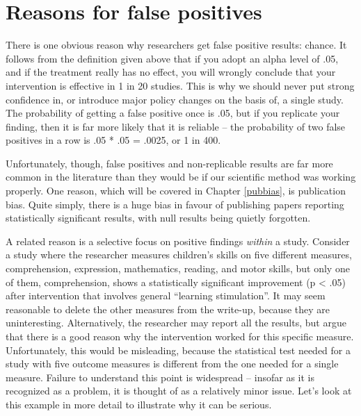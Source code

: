 \documentclass{krantz}
\begin{document}
\hypertarget{reasons-for-false-positives}{%
\section{Reasons for false positives}\label{reasons-for-false-positives}}

There is one obvious reason why researchers get false positive results: chance. It follows from the definition given above that if you adopt an alpha level of .05, and if the treatment really has no effect, you will wrongly conclude that your intervention is effective in 1 in 20 studies. This is why we should never put strong confidence in, or introduce major policy changes on the basis of, a single study. The probability of getting a false positive once is .05, but if you replicate your finding, then it is far more likely that it is reliable -- the probability of two false positives in a row is .05 * .05 = .0025, or 1 in 400.

Unfortunately, though, false positives and non-replicable results are far more common in the literature than they would be if our scientific method was working properly. One reason, which will be covered in Chapter \ref{pubbias}, is publication bias. Quite simply, there is a huge bias in favour of publishing papers reporting statistically significant results, with null results being quietly forgotten.

A related reason is a selective focus on positive findings \emph{within} a study. Consider a study where the researcher measures children's skills on five different measures, comprehension, expression, mathematics, reading, and motor skills, but only one of them, comprehension, shows a statistically significant improvement (p \textless{} .05) after intervention that involves general ``learning stimulation''. It may seem reasonable to delete the other measures from the write-up, because they are uninteresting. Alternatively, the researcher may report all the results, but argue that there is a good reason why the intervention worked for this specific measure. Unfortunately, this would be misleading, because the statistical test needed for a study with five outcome measures is different from the one needed for a single measure. Failure to understand this point is widespread -- insofar as it is recognized as a problem, it is thought of as a relatively minor issue. Let's look at this example in more detail to illustrate why it can be serious.
\end{document}
